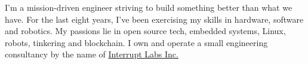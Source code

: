 \documentclass[9pt]{developercv} %
\begin{document}
\begin{minipage}[t]{0.4\textwidth} %
	\vspace{-\baselineskip} %

I'm a mission-driven engineer striving to build something better than what we
have. For the last eight years, I've been exercising my skills in hardware,
software and robotics. My passions lie in open source tech, embedded systems,
Linux, robots, tinkering and blockchain. I own and operate a small engineering
consultancy by the name of \href{interruptlabs.ca/}{Interrupt Labs Inc.}

\end{minipage}
\hfill %
\begin{minipage}[t]{0.5\textwidth} %
	\vspace{-\baselineskip} %
	\begin{barchart}{5.5}
	\end{barchart}
\end{minipage}

\end{document}
